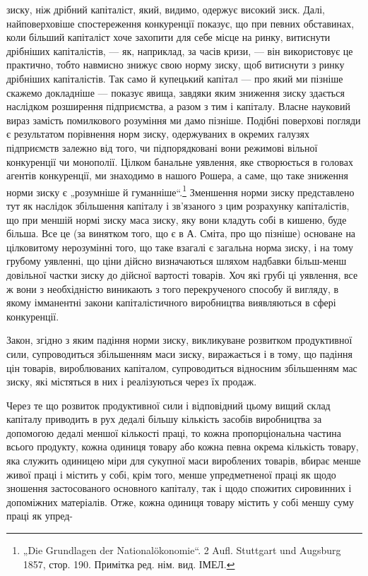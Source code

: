 зиску, ніж дрібний капіталіст, який, видимо, одержує високий зиск. Далі, найповерховіше
спостереження конкуренції показує, що при певних обставинах, коли більший капіталіст хоче захопити
для себе місце на ринку, витиснути дрібніших капіталістів, — як, наприклад, за часів кризи, — він
використовує це практично, тобто навмисно знижує свою норму зиску, щоб витиснути з ринку дрібніших
капіталістів. Так само й купецький капітал — про який ми пізніше скажемо докладніше — показує явища,
завдяки яким зниження зиску здається наслідком розширення підприємства, а разом з тим і капіталу.
Власне науковий вираз замість помилкового розуміння ми дамо пізніше. Подібні поверхові погляди є
результатом порівнення норм зиску, одержуваних в окремих галузях підприємств залежно від того, чи
підпорядковані вони режимові вільної конкуренції чи монополії. Цілком банальне уявлення, яке
створюється в головах агентів конкуренції, ми знаходимо в нашого Рошера, а саме, що таке зниження
норми зиску є „розумніше й гуманніше“.\footnote*{
„Die Grundlagen der Nationalökonomie“. 2 Aufl. Stuttgart und Augsburg 1857,
стор. 190. Примітка ред. нім. вид. ІМЕЛ.
} Зменшення норми зиску представлено тут як наслідок
збільшення капіталу і зв’язаного з цим розрахунку капіталістів, що при меншій нормі зиску маса
зиску, яку вони кладуть собі в кишеню, буде більша. Все це (за винятком того, що є в А. Сміта, про
що пізніше) основане на цілковитому нерозумінні того, що таке взагалі є загальна норма зиску, і на
тому грубому уявленні, що ціни дійсно визначаються шляхом надбавки більш-менш довільної частки зиску
до дійсної вартості товарів. Хоч які грубі ці уявлення, все ж вони з необхідністю виникають з того
перекрученого способу й вигляду, в якому імманентні закони капіталістичного виробництва виявляються
в сфері конкуренції.

Закон, згідно з яким падіння норми зиску, викликуване розвитком продуктивної сили, супроводиться
збільшенням маси зиску, виражається і в тому, що падіння цін товарів, вироблюваних капіталом,
супроводиться відносним збільшенням мас зиску, які містяться в них і реалізуються через їх продаж.

Через те що розвиток продуктивної сили і відповідний цьому вищий склад капіталу приводить в рух
дедалі більшу кількість засобів виробництва за допомогою дедалі меншої кількості праці, то кожна
пропорціональна частина всього продукту, кожна одиниця товару або кожна певна окрема кількість
товару, яка служить одиницею міри для сукупної маси вироблених товарів, вбирає менше живої праці і
містить у собі, крім того, менше упредметненої праці як щодо зношення застосованого основного
капіталу,
так і щодо спожитих сировинних і допоміжних матеріалів. Отже, кожна одиниця товару містить у собі
меншу суму праці як упред-